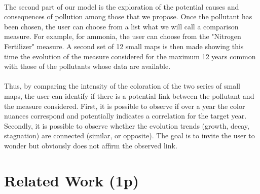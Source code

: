 \documentclass[preprint,journal]{vgtc}       %
\begin{document}
\paragraph{}
The second part of our model is the exploration of the potential causes and consequences of pollution among those that we propose. Once the pollutant has been chosen, the user can choose from a list what we will call a comparison measure. For example, for ammonia, the user can choose from the "Nitrogen Fertilizer" measure. A second set of 12 small maps is then made showing this time the evolution of the measure considered for the maximum 12 years common with those of the pollutants whose data are available.

\paragraph{}
Thus, by comparing the intensity of the coloration of the two series of small maps, the user can identify if there is a potential link between the pollutant and the measure considered. First, it is possible to observe if over a year the color nuances correspond and potentially indicates a correlation for the target year. Secondly, it is possible to observe whether the evolution trends (growth, decay, stagnation) are connected (similar, or opposite). The goal is to invite the user to wonder but obviously does not affirm the observed link.

\newpage


\section{Related Work (1p)}
\end{document}
